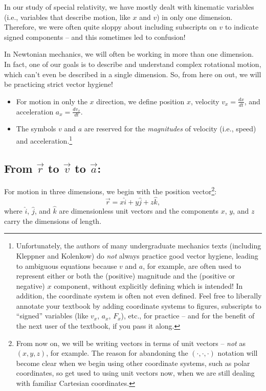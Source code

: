 \documentclass[11pt, letterpaper, openany]{book}
\begin{document}
In our study of special relativity, we have mostly dealt with kinematic variables (i.e., variables that describe motion, like $x$ and $v$) in only one dimension. Therefore, we were often quite sloppy about including subscripts on $v$ to indicate signed components -- and this sometimes led to confusion!

In Newtonian mechanics, we will often be working in more than one dimension. In fact, one of our goals is to describe and understand complex rotational motion, which can't even be described in a single dimension. So, from here on out, we will be practicing strict vector hygiene!
\begin{itemize}
    \item For motion in only the $x$ direction, we define position $x$, velocity $v_x = \frac{dx}{dt}$, and acceleration $a_x = \frac{dv_x}{dt}$.
    \item The symbols $v$ and $a$ are reserved for the \textit{magnitudes} of velocity (i.e., speed) and acceleration.\footnote{Unfortunately, the authors of many undergraduate mechanics texts (including Kleppner and Kolenkow) do \textit{not} always practice good vector hygiene, leading to ambiguous equations because $v$ and $a$, for example, are often used to represent either or both the (positive) magnitude and the (positive or negative) $x$ component, without explicitly defining which is intended! In addition, the coordinate system is often not even defined. Feel free to liberally annotate your textbook by adding coordinate systems to figures, subscripts to ``signed'' variables (like $v_x$, $a_x$, $F_x$), etc., for practice -- and for the benefit of the next user of the textbook, if you pass it along.}
\end{itemize}

\subsection{From $\vec{r}$ to $\vec{v}$ to $\vec{a}$:}

For motion in three dimensions, we begin with the position vector\footnote{From now on, we will be writing vectors in terms of unit vectors -- \textit{not} as $(x,y,z)$, for example. The reason for abandoning the $(\cdot, \cdot, \cdot)$ notation will become clear when we begin using other coordinate systems, such as polar coordinates, so get used to using unit vectors now, when we are still dealing with familiar Cartesian coordinates.}:
\[ \vec{r} = x\hat{i} + y\hat{j} + z\hat{k}, \]
where $\hat{i}$, $\hat{j}$, and $\hat{k}$ are dimensionless unit vectors and the components $x$, $y$, and $z$ carry the dimensions of length.
\end{document}
